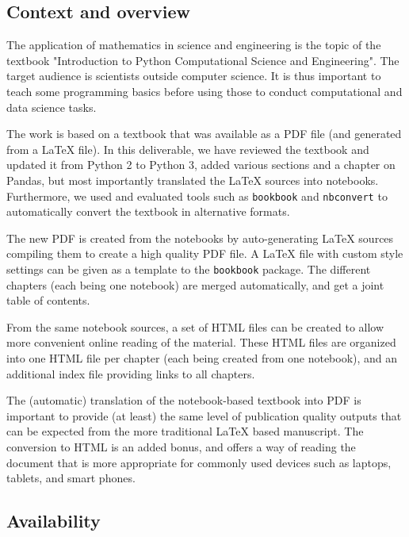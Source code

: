 \documentclass{deliverablereport}
\begin{document}
\subsection{Context and overview}


The application of mathematics in science and engineering is the topic
of the textbook "Introduction to Python Computational Science and
Engineering".
%
The target audience is scientists outside computer science. It is
thus important to teach some programming basics before using those to
conduct computational and data science tasks.

The work is based on a textbook that was available as a PDF file (and
generated from a \LaTeX{} file). In this deliverable, we have reviewed
the textbook and updated it from Python 2 to Python 3, added various
sections and a chapter on Pandas, but most importantly translated the
\LaTeX{} sources into \Jupyter notebooks. Furthermore, we used and
evaluated tools such as \texttt{bookbook} and \texttt{nbconvert} to
automatically convert the textbook in alternative formats.

The new PDF is created from the \Jupyter notebooks by auto-generating
\LaTeX{} sources compiling them to create a high quality PDF file. A
\LaTeX{} file with custom style settings can be given as a template to
the \texttt{bookbook} package. The different chapters (each being one
notebook) are merged automatically, and get a joint table of contents.

From the same \Jupyter notebook sources, a set of HTML files can be
created to allow more convenient online reading of the material. These
HTML files are organized into one HTML file per chapter (each being
created from one notebook), and an additional index file providing
links to all chapters.

The (automatic) translation of the \Jupyter notebook-based textbook
into PDF is important to provide (at least) the same level of
publication quality outputs that can be expected from the more
traditional \LaTeX{} based manuscript. The conversion to HTML is an
added bonus, and offers a way of reading the document that is more
appropriate for commonly used devices such as laptops, tablets, and
smart phones.


\subsection{Availability}
\end{document}
